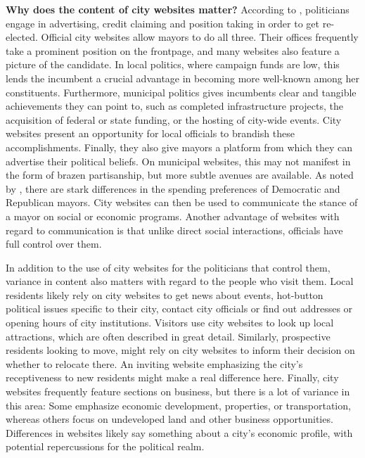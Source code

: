 \documentclass[11pt]{article}
\begin{document}
\textbf{Why does the content of city websites matter?} According to \cite{Mayhew1974}, politicians engage in advertising, credit claiming and position taking in order to get re-elected. Official city websites allow mayors to do all three. Their offices frequently take a prominent position on the frontpage, and many websites also feature a picture of the candidate. In local politics, where campaign funds are low, this lends the incumbent a crucial advantage in becoming more well-known among her constituents. Furthermore, municipal politics gives incumbents clear and tangible achievements they can point to, such as completed infrastructure projects, the acquisition of federal or state funding, or the hosting of city-wide events. City websites present an opportunity for local officials to brandish these accomplishments. Finally, they also give mayors a platform from which they can advertise their political beliefs. On municipal websites, this may not manifest in the form of brazen partisanship, but more subtle avenues are available. As noted by \cite{einstein2016mayors}, there are stark differences in the spending preferences of Democratic and Republican mayors. City websites can then be used to communicate the stance of a mayor on social or economic programs. Another advantage of websites with regard to communication is that unlike direct social interactions, officials have full control over them.

In addition to the use of city websites for the politicians that control them, variance in content also matters  with regard to the people who visit them. Local residents likely rely on city websites to get news about events, hot-button political issues specific to their city, contact city officials or find out addresses or opening hours of city institutions. Visitors use city websites to look up local attractions, which are often described in great detail. Similarly, prospective residents looking to move, might rely on city websites to inform their decision on whether to relocate there. An inviting website emphasizing the city's receptiveness to new residents might make a real difference here. Finally, city websites frequently feature sections on business, but there is a lot of variance in this area: Some emphasize economic development, properties, or transportation, whereas others focus on undeveloped land and other business opportunities. Differences in websites likely say something about a city's economic profile, with potential repercussions for the political realm.
\end{document}
